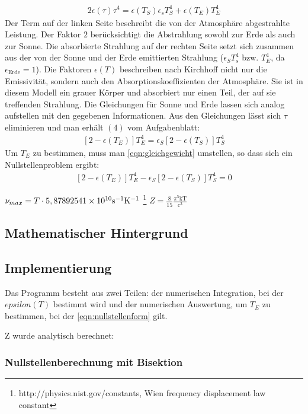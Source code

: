 \documentclass[10pt,a4paper]{article}
\begin{document}
\begin{align}
2\epsilon(\tau)\tau^4=\epsilon(T_S)\epsilon_s T_S^4+\epsilon(T_E)T_E^4
\end{align}
Der Term auf der linken Seite beschreibt die von der Atmosphäre abgestrahlte Leistung. Der Faktor $2$ berücksichtigt die Abstrahlung sowohl zur Erde als auch zur Sonne. Die absorbierte Strahlung auf der rechten Seite setzt sich zusammen aus der von der Sonne und der Erde emittierten Strahlung ($\epsilon_S T_s^4$ bzw. $T_E^4$, da $\epsilon_{\mathrm{Erde}}=1$). Die Faktoren $\epsilon(T)$ beschreiben nach Kirchhoff nicht nur die Emissivität, sondern auch den Absorptionskoeffizienten der Atmosphäre. Sie ist in diesem Modell ein grauer Körper und absorbiert nur einen Teil, der auf sie treffenden Strahlung. Die Gleichungen für Sonne und Erde lassen sich analog aufstellen mit den gegebenen Informationen.
Aus den Gleichungen lässt sich $\tau$ eliminieren und man erhält $(4)$ vom Aufgabenblatt:
\begin{align}
\left[2-\epsilon(T_E)\right]T_E^4=\epsilon_S\left[2-\epsilon(T_S)\right]T_S^4
\label{eqn:gleichgewicht}
\end{align}
Um $T_E$ zu bestimmen, muss man \ref{eqn:gleichgewicht} umstellen, so dass sich ein Nullstellenproblem ergibt:
\begin{align}
\left[2-\epsilon(T_E)\right]T_E^4-\epsilon_S\left[2-\epsilon(T_S)\right]T_S^4=0
\label{eqn:nullstellenform}
\end{align}


$\nu_{max}=T\cdot 5,8789254\num{1E10}\si{\per\second}\si{\per\kelvin}$ \footnote{http://physics.nist.gov/constants, Wien frequency displacement law constant}
$Z=\frac{8}{15}\frac{\pi^5 \mathrm{kT}}{\mathrm{c}^3}$

\subsection{Mathematischer Hintergrund}

\subsection{Implementierung}

Das Programm besteht aus zwei Teilen: der numerischen Integration, bei der $epsilon(T)$ bestimmt wird und der numerischen Auswertung, um $T_E$ zu bestimmen, bei der \ref{eqn:nullstellenform} gilt.

Z wurde analytisch berechnet: 

\subsubsection{Nullstellenberechnung mit Bisektion}
\end{document}
